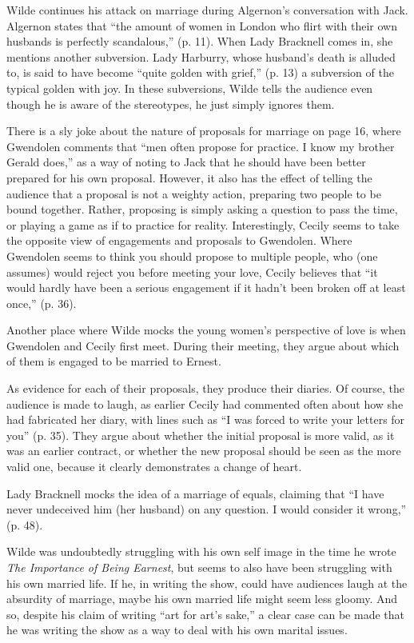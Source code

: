 \documentclass[12pt]{article}[titlepage]
\newcommand{\say}[1]{``#1''}
\newcommand{\1}{\={a}}
\newcommand{\2}{\={e}}
\newcommand{\3}{\={\i}}
\newcommand{\4}{\=o}
\newcommand{\5}{\=u}
\newcommand{\6}{\={A}}
\renewcommand{\,}{\textsuperscript{,}}
\begin{document}
Wilde continues his attack on marriage during Algernon's conversation with Jack.
Algernon states that \say{the amount of women in London who flirt with their own husbands is perfectly scandalous,} (p. 11).
When Lady Bracknell comes in, she mentions another subversion.
Lady Harburry, whose husband's death is alluded to, is said to have become \say{quite golden with grief,} (p. 13) a subversion of the typical golden with joy.
In these subversions, Wilde tells the audience even though he is aware of the stereotypes, he just simply ignores them.

There is a sly joke about the nature of proposals for marriage on page 16, where Gwendolen comments that \say{men often propose for practice. I know my brother Gerald does,} as a way of noting to Jack that he should have been better prepared for his own proposal.
However, it also has the effect of telling the audience that a proposal is not a weighty action, preparing two people to be bound together.
Rather, proposing is simply asking a question to pass the time, or playing a game as if to practice for reality.
Interestingly, Cecily seems to take the opposite view of engagements and proposals to Gwendolen.
Where Gwendolen seems to think you should propose to multiple people, who (one assumes) would reject you before meeting your love, Cecily believes that \say{it would hardly have been a serious engagement if it hadn't been broken off at least once,} (p. 36).

Another place where Wilde mocks the young women's perspective of love is when Gwendolen and Cecily first meet.
During their meeting, they argue about which of them is engaged to be married to Ernest.

As evidence for each of their proposals, they produce their diaries.
Of course, the audience is made to laugh, as earlier Cecily had commented often about how she had fabricated her diary, with lines such as \say{I was forced to write your letters for you} (p. 35).
They argue about whether the initial proposal is more valid, as it was an earlier contract, or whether the new proposal should be seen as the more valid one, because it clearly demonstrates a change of heart.

Lady Bracknell mocks the idea of a marriage of equals, claiming that \say{I have never undeceived him (her husband) on any question. I would consider it wrong,} (p. 48).

Wilde was undoubtedly struggling with his own self image in the time he wrote \textit{The Importance of Being Earnest}, but seems to also have been struggling with his own married life.
If he, in writing the show, could have audiences laugh at the absurdity of marriage, maybe his own married life might seem less gloomy.
And so, despite his claim of writing \say{art for art's sake,} a clear case can be made that he was writing the show as a way to deal with his own marital issues.
\end{document}
